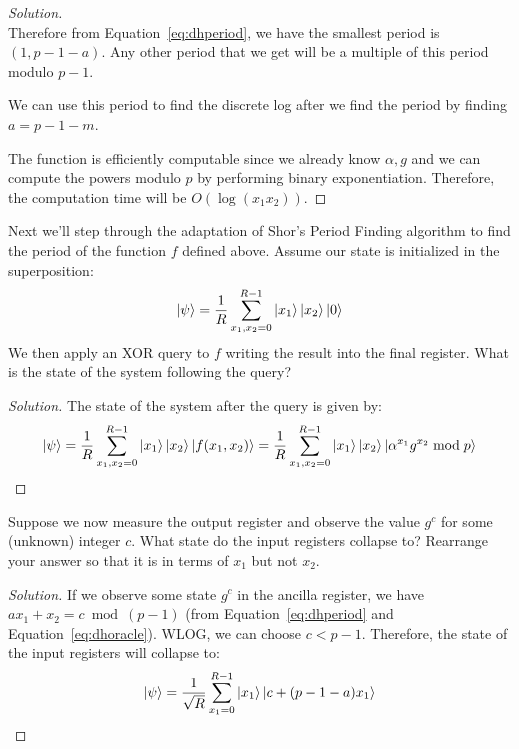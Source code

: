 \begin{solution}[label=ques:4a]
\begin{proof}[Solution]
\begin{equation}
      \label{eq:dhperiod}
    \end{equation}
    Therefore from Equation~\ref{eq:dhperiod}, we have the smallest period is $(1, p - 1 - a)$. Any other period that we get will be a multiple of this period modulo $p - 1$.\par
    We can use this period to find the discrete log after we find the period by finding $a = p - 1 - m$.\par
    The function is efficiently computable since we already know $\alpha, g$ and we can compute the powers modulo $p$ by performing binary exponentiation. Therefore, the computation time will be $O(\log(x_1x_2))$.
  \end{proof}
\end{solution}

\begin{solution}[label=ques:4b]
  \begin{question}
    Next we'll step through the adaptation of Shor's Period Finding algorithm to find the period of the function $f$ defined above. Assume our state is initialized in the superposition:
\[
\ket{\psi} = \frac{1}{R}\sum_{x_1,x_2 =0}^{R-1}  \ket{x_1}\ket{x_2}\ket{0}
\]
We then apply an XOR query to $f$ writing the result into the final register. What is the state of the system following the query?
  \end{question}
  \tcblower{}
  \begin{proof}[Solution]
    The state of the system after the query is given by:
    \begin{equation}
      \ket{\psi} = \frac{1}{R}\sum_{x_1,x_2 =0}^{R-1}  \ket{x_1}\ket{x_2}\ket{f(x_1, x_2)} = \frac{1}{R}\sum_{x_1,x_2 =0}^{R-1}  \ket{x_1}\ket{x_2}\ket{\alpha^{x_1}g^{x_2} \bmod p}
      \label{eq:dhoracle}
    \end{equation}
  \end{proof}
\end{solution}

\begin{solution}[label=ques:4c]
  \begin{question}
    Suppose we now measure the output register and observe the value $g^c$ for some (unknown) integer $c$. What state do the input registers collapse to? Rearrange your answer so that it is in terms of $x_1$ but not $x_2$.
  \end{question}
  \tcblower{}
  \begin{proof}[Solution]
    If we observe some state $g^c$ in the ancilla register, we have $a x_1 + x_2 = c \bmod (p - 1)$ (from Equation~\ref{eq:dhperiod} and Equation~\ref{eq:dhoracle}). WLOG, we can choose $c < p - 1$. Therefore, the state of the input registers will collapse to:
    \begin{equation}
      \ket{\psi} = \frac{1}{\sqrt{R}}\sum_{x_1 =0}^{R-1}  \ket{x_1}\ket{c + (p - 1 - a)x_1}
      \label{eq:dhcollapse}
    \end{equation}
  \end{proof}
\end{solution}

